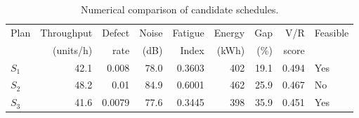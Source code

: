 \begin{table}[htbp]
\centering
\caption{Numerical comparison of candidate schedules.}
\label{tab:numerical-sim}
\small
\begin{tabular}{@{}lrrrrrrrl@{}}
\toprule
Plan & Throughput & Defect & Noise & Fatigue & Energy & Gap & V/R & Feasible \\
     & (units/h)  & rate   & (dB)  & Index   & (kWh)  & (\%) & score &         \\
\midrule
$S_{1}$ & 42.1 & 0.008 & 78.0 & 0.3603 & 402 & 19.1 & 0.494 & Yes \\
$S_{2}$ & 48.2 & 0.01 & 84.9 & 0.6001 & 462 & 25.9 & 0.467 & No \\
$S_{3}$ & 41.6 & 0.0079 & 77.6 & 0.3445 & 398 & 35.9 & 0.451 & Yes \\
\bottomrule
\end{tabular}
\end{table}
